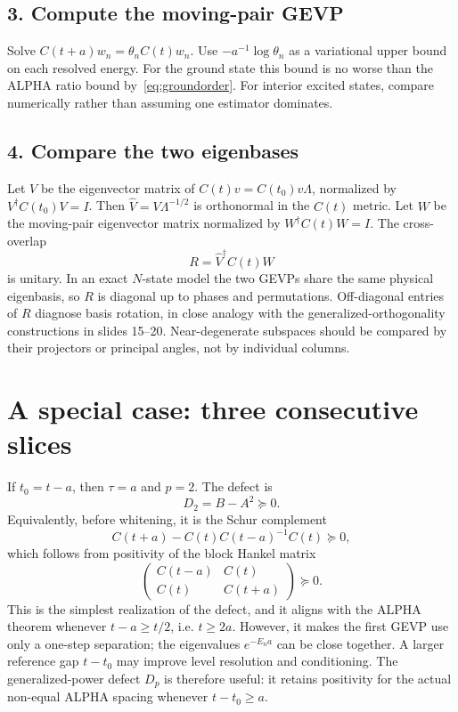 \documentclass[11pt]{article}
\begin{document}
\subsection{3. Compute the moving-pair GEVP}
Solve $C(t+a)w_n=\theta_n C(t)w_n$. Use $-a^{-1}\log\theta_n$ as a variational upper bound on each resolved energy. For the ground state this bound is no worse than the ALPHA ratio bound by~\eqref{eq:groundorder}. For interior excited states, compare numerically rather than assuming one estimator dominates.

\subsection{4. Compare the two eigenbases}
Let $V$ be the eigenvector matrix of $C(t)v=C(t_0)v\Lambda$, normalized by $V^\dagger C(t_0)V=I$. Then $\widehat V=V\Lambda^{-1/2}$ is orthonormal in the $C(t)$ metric. Let $W$ be the moving-pair eigenvector matrix normalized by $W^\dagger C(t)W=I$. The cross-overlap
\[
R=\widehat V^\dagger C(t)W
\]
is unitary. In an exact $N$-state model the two GEVPs share the same physical eigenbasis, so $R$ is diagonal up to phases and permutations. Off-diagonal entries of $R$ diagnose basis rotation, in close analogy with the generalized-orthogonality constructions in slides 15--20. Near-degenerate subspaces should be compared by their projectors or principal angles, not by individual columns.

\section{A special case: three consecutive slices}
If $t_0=t-a$, then $\tau=a$ and $p=2$. The defect is
\[
D_2=B-A^2\succeq0.
\]
Equivalently, before whitening, it is the Schur complement
\[
C(t+a)-C(t)C(t-a)^{-1}C(t)\succeq0,
\]
which follows from positivity of the block Hankel matrix
\[
\begin{pmatrix}
C(t-a)&C(t)\\ C(t)&C(t+a)
\end{pmatrix}\succeq0.
\]
This is the simplest realization of the defect, and it aligns with the ALPHA theorem whenever $t-a\geq t/2$, i.e. $t\geq2a$. However, it makes the first GEVP use only a one-step separation; the eigenvalues $e^{-E_n a}$ can be close together. A larger reference gap $t-t_0$ may improve level resolution and conditioning. The generalized-power defect $D_p$ is therefore useful: it retains positivity for the actual non-equal ALPHA spacing whenever $t-t_0\geq a$.
\end{document}
